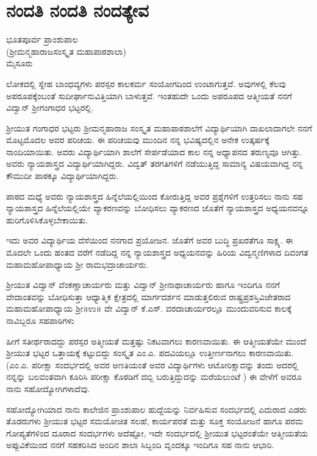\chapter{ನಂದತಿ ನಂದತಿ ನಂದತ್ಯೇವ}                           

\begin{center}
\smallskip

ಭೂತಪೂರ್ವ ಪ್ರಾಂಶುಪಾಲ\\
(ಶ್ರೀಮನ್ಮಹಾರಾಜಸಂಸ್ಕೃತ  ಮಹಾಪಾಠಶಾಲಾ)\\
ಮೈಸೂರು
\addrule
\end{center}
ಲೋಕದಲ್ಲಿ ಸ್ನೇಹ ಬಾಂಧವ್ಯಗಳು ಪರಸ್ಪರ ಕಾಲಕರ್ಮ ಸಂಯೋಗದಿಂದ ಉಂಟಾಗುತ್ತವೆ. ಅವುಗಳಲ್ಲಿ ಕೆಲವು ಅಪರೂಪಕ್ಕೆಂಬಂತೆ ಸುದೀರ್ಘಾನುವಿತ್ತಿಯಾಗಿ ಬಾಳುತ್ತವೆ. ಇಂತಹುದೇ ಒಂದು ಅಪರೂಪದ ಆತ್ಮೀಯತೆ ನನಗೆ ವಿದ್ವಾನ್ ಶ್ರೀಗಂಗಾಧರ ಭಟ್ಟರಲ್ಲಿ. 

ಶ್ರೀಯುತ ಗಂಗಾಧರ ಭಟ್ಟರು ಶ್ರೀಮನ್ಮಹಾರಾಜ ಸಂಸ್ಕೃತ ಮಹಾಪಾಠಶಾಲೆಗೆ ವಿದ್ಯಾರ್ಥಿಯಾಗಿ ದಾಖಲಾದಾಗಲೇ ನನಗೆ ಮೊಟ್ಟಮೊದಲ ಅವರ ಪರಿಚಯ. ಈ ಪರಿಚಯವು ಮುಂದಿನ ನನ್ನ ಭವಿಷ್ಯದಲ್ಲಿನ ಅನೇಕ ಉತ್ಕರ್ಷಕ್ಕೆ ನಾಂದಿಯಾಯಿತು.  ಅವರು ವಿದ್ಯಾರ್ಥಿಯಾಗಿ ಶಾಲೆಗೆ ಸೇರ್ಪಡೆಯಾದ ಕಾಲ ನನ್ನ ಅಧ್ಯಾಪನದ ತರುಣ್ಯವೂ ಆಗಿತ್ತು. ಅವರು ನ್ಯಾಯಶಾಸ್ತ್ರದ ವಿದ್ಯಾರ್ಥಿಯಾಗಿದ್ದರು. ವಿದ್ವತ್ ತರಗತಿಗಳಿಗೆ ನಡೆಯುತ್ತಿದ್ದ ಸಾಮಾನ್ಯ ವಿಷಯವಾಗಿದ್ದ ನನ್ನ ಕೌಮುದೀ ಪಾಠಕ್ಕೂ ವಿದ್ಯಾರ್ಥಿಯಾಗಿದ್ದರು.

ಪಾಠದ ಮಧ್ಯೆ ಅವರು ನ್ಯಾಯಶಾಸ್ತ್ರದ ಹಿನ್ನೆಲೆಯಲ್ಲಿಯಿಂದ ಕೋರುತ್ತಿದ್ದ ಅವರ ಪ್ರಶ್ನೆಗಳಿಗೆ ಉತ್ತರಿಸಲು ನಾನು ಸಹ ನ್ಯಾಯಶಾಸ್ತ್ರದ ಹಿನ್ನೆಲೆಯಲ್ಲಿಯೇ ವ್ಯಾಕರಣವನ್ನು ಬೋಧಿಸಲು ವ್ಯಾಕರಣದ ಜೊತೆಗೆ ನ್ಯಾಯಶಾಸ್ತ್ರದ ಅಧ್ಯಯನವನ್ನೂ ಹುರಿಗೊಳಿಸಿಕೊಳ್ಳಬೇಕಾಯಿತು. 

ಇದು ಅವರ ವಿದ್ಯಾರ್ಥಿಯ ದೆಸೆಯಿಂದ ನನಗಾದ ಪ್ರಯೋಜನ. ಜೊತೆಗೆ ಅವರ ಬುದ್ಧಿ ಪ್ರಖರತೆಗೂ ಸಾಕ್ಷ್ಯ. ಈ ಮೊದಲೇ ಒಂದು ಹಂತದ ವರೆಗೆ ನಡೆದಿದ್ದ ನನ್ನ ನ್ಯಾಯಶಾಸ್ತ್ರದ ಅಧ್ಯಯನವನ್ನು ಹಿರಿಯ ವಿದ್ವನ್ಮಣಿಗಳಾದ ದಿವಂಗತ ಮಹಾಮಹೋಪಾಧ್ಯಾಯ ಶ್ರೀ ರಾಮಭದ್ರಾಚಾರ್ಯರು.

ಶ್ರೀಯುತ ವಿದ್ವಾನ್ ವೆಂಕಣ್ಣಾಚಾರ್ಯರು ಮತ್ತು ವಿದ್ವಾನ್ ಶ್ರೀನಾಥಾಚಾರ್ಯರು ಹಾಗೂ ಇಂದಿಗೂ ನನಗೆ ವೇದಾಂತವನ್ನು ಬೋಧಿಸುತ್ತಾ ಆಧ್ಯಾತ್ಮಿಕ ಕ್ಷೇತ್ರದಲ್ಲಿ ಮಾರ್ಗದರ್ಶನ ಮಾಡುತ್ತಲಿರುವ ರಾಷ್ಟ್ರಪ್ರಶಸ್ತಿವಿಜೇತರಾದ ಮಹಾಮಹೋಪಾಧ್ಯಾಯ ಶ್ರೀ॥ಉ॥ ವೇ ವಿದ್ವಾನ್ ಕೆ.ಎಸ್. ವರದಾಚಾರ್ಯರಲ್ಲೂ ಮುಂದುವರಿಸುವ ಕಾಲಕ್ಕೆ ನಾವಿಬ್ಬರೂ ಸಹಪಾಠಿಗಳು

ಹೀಗೆ ಸತೀರ್ಥರಾದದ್ದು ಪರಸ್ಪರ ಅತ್ಮೀಯತೆ ಮತ್ತಷ್ಟು ನಿಕಟವಾಗಲು ಕಾರಣವಾಯಿತು. ಈ ಆತ್ಮೀಯತೆಯೇ ಮುಂದೆ ಶ್ರೀಯುತ ಭಟ್ಟರ ಒತ್ತಾಯಕ್ಕೆ ಕಟ್ಟುಬಿದ್ದು ಸಂಸ್ಕೃತ ಎಂ.ಎ. ಪದವಿಯಲ್ಲೂ ಉತ್ತೀರ್ಣನಾಗಲು ಕಾರಣವಾಯಿತು. (ಎಂ.ಎ. ಪರೀಕ್ಷಾ ಸಂದರ್ಭದಲ್ಲಿ ಅವರ ಅಣತಿಯಂತೆ ಅವರ ವಿದ್ಯಾರ್ಥಿಗಳು ಆಟೋರಿಕ್ಷಾವನ್ನು ತಂದು ಅದರಲ್ಲಿ ನನ್ನನ್ನು ಬಲವಂತವಾಗಿ ಕೂರಿಸಿ ಪರೀಕ್ಷಾ ಕೊಠಡಿಗೆ ದಬ್ಬಿ ಬರುತ್ತಿದ್ದುದನ್ನು ಮರೆಯಲುಂಟೆ ) ಈ ವೇಳೆಗೆ ಅವರೂ ನಾನು ಸಹೋದ್ಯೋಗಿಗಳಾದೆವು. 

ಸಹೋದ್ಯೋಗಿಯಾದ ನಾನು ಕಾಲೇಜಿನ ಪ್ರಾಂಶುಪಾಲ ಹುದ್ದೆಯನ್ನು ನಿರ್ವಹಿಸುವ ಸಂದರ್ಭದಲ್ಲಿ ಎದುರಾದ ಎಡರು ತೊಡರುಗಳು ಶ್ರೀಯುತ ಭಟ್ಟರ ಸಮಯೋಚಿತ ಸಲಹೆ, ಕಾರ್ಯಪರತೆ ಮತ್ತು ಸೂಕ್ತ ಸಂಯೋಜನೆ ಹಾಗೂ ಪರಮ ಗೋಪ್ಯತೆಗಳಿಂದ ದೂರಾದ ಸಂದರ್ಭಗಳು ಅದೆಷ್ಟೋ, ಇದೇ ಸಂದರ್ಭದಲ್ಲಿ ಶ್ರೀಯುತ ಭಟ್ಟರಂತೆಯೇ ಆತ್ಮೀಯತೆಯ ಅಪ್ಪುವಿಕೆಯಿಂದ ನನಗೆ ಸಹಕರಿಸಿದ ಅಂದಿನ ಶಾಲಾ ಸಿಬ್ಬಂದಿ ವೃಂದಕ್ಕೂ ಇಂದಿಗೂ ಸಹ ನಾನು ಆಭಾರಿ. 

